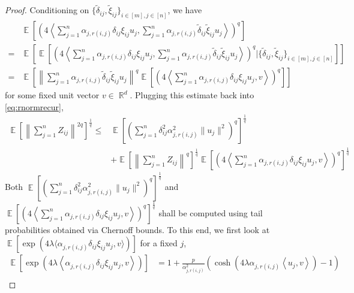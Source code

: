 \documentclass[11pt]{amsart}
\numberwithin{equation}{section}
\numberwithin{equation}{section}
\DeclareMathOperator{\E}{\mathbb{E}}
\DeclareMathOperator{\R}{\mathbb{R}}
\theoremstyle{remark}
\theoremstyle{definition}
\begin{document}
\begin{proof}
    Conditioning on $\{ \widetilde{\delta}_{ij}, \widetilde{\xi}_{ij} \}_{i \in [m], j \in [n]}$, we have
    \begin{align*}
        &\E \left[ \left( 4 \left\langle \sum_{j=1}^n \alpha_{j,r(i,j)} \delta_{ij} \xi_{ij} u_{j}, \sum_{j=1}^n \alpha_{j,r(i,j)} \widetilde{\delta}_{ij} \widetilde{\xi}_{ij} u_{j} \right\rangle  \right)^q \right] 
        \\=& \E \left[ \E \left[ \left ( 4 \left\langle \sum_{j=1}^n \alpha_{j,r(i,j)} \delta_{ij} \xi_{ij} u_{j}, \sum_{j=1}^n \alpha_{j,r(i,j)} \widetilde{\delta}_{ij} \widetilde{\xi}_{ij} u_{j} \right\rangle  \right)^q \Bigg| \{ \widetilde{\delta}_{ij}, \widetilde{\xi}_{ij} \}_{i \in [m], j \in [n]} \right] \right] \\ = &
        \E \left[ \left\| \sum_{j=1}^n \alpha_{j,r(i,j)} \widetilde{\delta}_{ij} \widetilde{\xi}_{ij} u_{j} \right\|^q \E \left[ \left( 4 \left\langle \sum_{j=1}^n \alpha_{j,r(i,j)} \delta_{ij} \xi_{ij} u_{j}, v \right\rangle  \right)^q \right] \right]
    \end{align*}
    for some fixed unit vector $v \in \R^d$. Plugging this estimate back into \eqref{eq:rnormrecur}, 
    \begin{align*}
        \E \left[ \left\|\sum_{j=1}^n  Z_{ij} \right\|^{2q} \right]^\frac{1}{q} \le &\E \left[ \left ( \sum_{j=1}^n \delta_{ij}^2 \alpha^2_{j,r(i,j)} \| u_j \| ^2 \right)^q \right]^\frac{1}{q} \\&+ \E \left[ \left\|\sum_{j=1}^n  Z_{ij} \right\|^{q} \right]^\frac{1}{q} \E \left[ \left( 4 \left\langle \sum_{j=1}^n \alpha_{j,r(i,j)} \delta_{ij} \xi_{ij} u_{j}, v \right\rangle  \right)^q \right]^\frac{1}{q} 
    \end{align*}
    Both $\E \left[ \left ( \sum_{j=1}^n \delta_{ij}^2 \alpha_{j,r(i,j)}^2 \| u_j \| ^2 \right)^q \right]^\frac{1}{q}$ and $\E \left[ \left( 4 \left\langle \sum_{j=1}^n \alpha_{j,r(i,j)}\delta_{ij} \xi_{ij} u_{j}, v \right\rangle  \right)^q \right]^\frac{1}{q}$ shall be computed using tail probabilities obtained via Chernoff bounds. To this end, we first look at $\E [ \exp (4\lambda \langle \alpha_{j,r(i,j)} \delta_{ij} \xi_{ij} u_{j}, v \rangle ) ]$ for a fixed $j$,
    \begin{align*}
        \E \left[ \exp \left(4\lambda \left\langle \alpha_{j,r(i,j)} \delta_{ij} \xi_{ij} u_{j}, v \right\rangle \right) \right] &= 1 + \frac{p}{\alpha^2_{j,r(i,j)}} \left( \cosh\left(  4\lambda\alpha_{j,r(i,j)} \left\langle  u_{j}, v \right\rangle \right) - 1\right) \\

\end{align*}
\end{proof}
\end{document}
